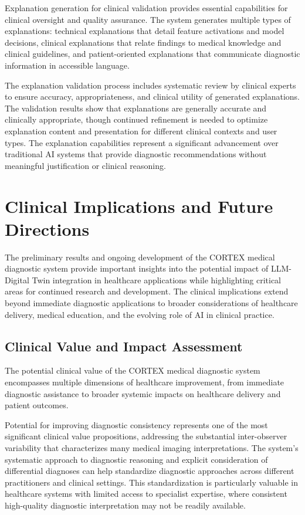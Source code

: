 Explanation generation for clinical validation provides essential capabilities for clinical oversight and quality assurance. The system generates multiple types of explanations: technical explanations that detail feature activations and model decisions, clinical explanations that relate findings to medical knowledge and clinical guidelines, and patient-oriented explanations that communicate diagnostic information in accessible language.

The explanation validation process includes systematic review by clinical experts to ensure accuracy, appropriateness, and clinical utility of generated explanations. The validation results show that explanations are generally accurate and clinically appropriate, though continued refinement is needed to optimize explanation content and presentation for different clinical contexts and user types. The explanation capabilities represent a significant advancement over traditional AI systems that provide diagnostic recommendations without meaningful justification or clinical reasoning.

\section{Clinical Implications and Future Directions}

The preliminary results and ongoing development of the CORTEX medical diagnostic system provide important insights into the potential impact of LLM-Digital Twin integration in healthcare applications while highlighting critical areas for continued research and development. The clinical implications extend beyond immediate diagnostic applications to broader considerations of healthcare delivery, medical education, and the evolving role of AI in clinical practice.

\subsection{Clinical Value and Impact Assessment}

The potential clinical value of the CORTEX medical diagnostic system encompasses multiple dimensions of healthcare improvement, from immediate diagnostic assistance to broader systemic impacts on healthcare delivery and patient outcomes.

Potential for improving diagnostic consistency represents one of the most significant clinical value propositions, addressing the substantial inter-observer variability that characterizes many medical imaging interpretations. The system's systematic approach to diagnostic reasoning and explicit consideration of differential diagnoses can help standardize diagnostic approaches across different practitioners and clinical settings. This standardization is particularly valuable in healthcare systems with limited access to specialist expertise, where consistent high-quality diagnostic interpretation may not be readily available.

